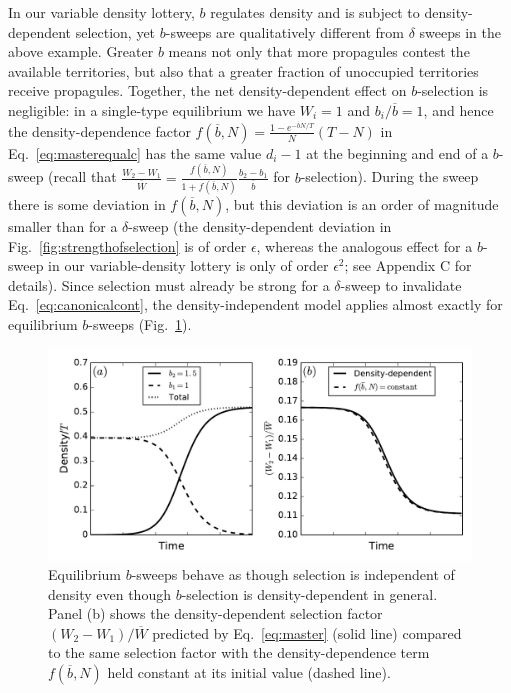 \documentclass[12pt]{article}
\begin{document}
In our variable density lottery, $b$ regulates density and is subject to density-dependent selection, yet $b$-sweeps are qualitatively different from $\delta$ sweeps in the above example. Greater $b$ means not only that more propagules contest the available territories, but also that a greater fraction of unoccupied territories receive propagules. Together, the net density-dependent effect on $b$-selection is negligible: in a single-type equilibrium we have $W_i=1$ and $b_i/\overline{b}=1$, and hence the density-dependence factor $f(\overline{b},N)=\frac{1-e^{-\overline{b}N/T}}{N}(T-N)$ in Eq.~\eqref{eq:masterequalc} has the same value $d_i-1$ at the beginning and end of a $b$-sweep (recall that $\frac{W_2-W_1}{\overline{W}}=\frac{f(\overline{b},N)}{1+f(\overline{b},N)}\frac{b_2-b_1}{\overline{b}}$ for $b$-selection). During the sweep there is some deviation in $f(\overline{b},N)$, but this deviation is an order of magnitude smaller than for a $\delta$-sweep (the density-dependent deviation in Fig.~\ref{fig:strengthofselection} is of order $\epsilon$, whereas the analogous effect for a $b$-sweep in our variable-density lottery is only of order $\epsilon^2$; see Appendix C for details). Since selection must already be strong for a $\delta$-sweep to invalidate Eq.~\eqref{eq:canonicalcont}, the density-independent model applies almost exactly for equilibrium $b$-sweeps (Fig.~\ref{fig:bsweep}).

\begin{figure}
\centering
\includegraphics[scale=0.8]{bsweep.pdf}
\caption{\label{fig:bsweep} Equilibrium $b$-sweeps behave as though selection is independent of density even though $b$-selection is density-dependent in general. Panel (b) shows the density-dependent selection factor $(W_2-W_1)/\overline{W}$ predicted by Eq.~\eqref{eq:master} (solid line) compared to the same selection factor with the density-dependence term $f(\overline{b},N)$ held constant at its initial value (dashed line).}
\end{figure}
\end{document}
